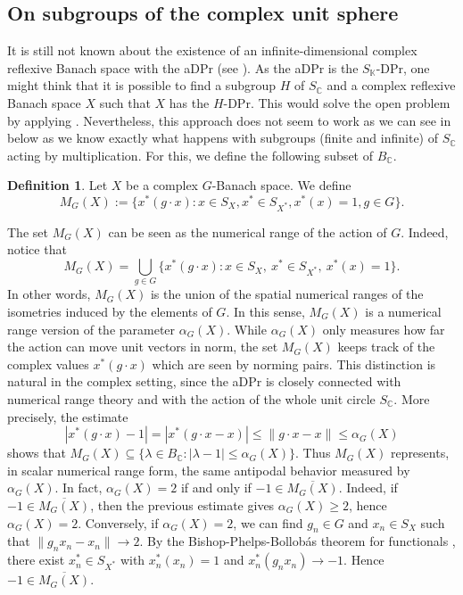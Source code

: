 \documentclass[a4paper,12pt]{amsart}
\theoremstyle{definition}
\theoremstyle{definition}
\newtheorem{definition}[theorem]{Definition}
\theoremstyle{remark}
\numberwithin{equation}{section}
\newcommand{\C}{\mathbb{C}}
\newcommand{\K}{\mathbb{K}}
\renewcommand{\geq}{\geqslant}
\renewcommand{\leq}{\leqslant}
\newcommand{\<}{\langle}
\renewcommand{\>}{\rangle}
\begin{document}
	
	
	
	
	
	
	
	\subsection{On subgroups of the complex unit sphere}  It is still not known about the existence of an infinite-dimensional complex reflexive Banach space with the aDPr (see \cite[Problem 12.6]{KMRW}). As the aDPr is the $S_{\K}$-DPr, one might think that it is possible to find a subgroup $H$ of $S_{\C}$ and a complex reflexive Banach space $X$ such that $X$ has the $H$-DPr. This would solve the open problem by applying . Nevertheless, this approach does not seem to work as we can see in  below as we know exactly what happens with subgroups (finite and infinite) of $S_{\C}$ acting by multiplication. For this, we define the following subset of $B_{\C}$.
	
	
	\begin{definition} Let $X$ be a complex $G$-Banach space. We define 
		\begin{equation*} 
			M_G(X) := \{x^*(g \cdot x): x \in S_X, x^* \in S_{X^*}, x^*(x) = 1, g \in G \}.
		\end{equation*}
	\end{definition}
	The set $M_G(X)$ can be seen as the numerical range of the action of $G$. Indeed, notice that
	\begin{equation*} 
		M_G(X) = \bigcup_{g\in G} \{x^*(g\cdot x): x\in S_X,\ x^*\in S_{X^*},\ x^*(x)=1\}.
	\end{equation*}
	In other words, $M_G(X)$ is the union of the spatial numerical ranges of the isometries induced by the elements of $G$. In this sense, $M_G(X)$ is a numerical range version of the parameter $\alpha_G(X)$. While $\alpha_G(X)$ only measures how far the action can move unit vectors in norm, the set $M_G(X)$ keeps track of the complex values $x^*(g \cdot x)$ which are seen by norming pairs. This distinction is natural in the complex setting, since the aDPr is closely connected
	with numerical range theory and with the action of the whole unit circle $S_{\C}$. More precisely, the estimate
	\begin{equation*} 
		|x^*(g\cdot x)-1| = |x^*(g\cdot x-x)| \leq \|g\cdot x-x\| \leq \alpha_G(X)
	\end{equation*} 
	shows that $M_G(X)\subseteq \{\lambda\in B_{\C}:|\lambda-1|\leq \alpha_G(X)\}$. Thus $M_G(X)$ represents, in scalar numerical range form, the same antipodal
	behavior measured by $\alpha_G(X)$. In fact, $\alpha_G(X)=2$ if and only if
	$-1\in\overline{M_G(X)}$. Indeed, if $-1\in\overline{M_G(X)}$, then the previous estimate gives
	$\alpha_G(X)\geq 2$, hence $\alpha_G(X)=2$. Conversely, if $\alpha_G(X)=2$,
	we can find $g_n\in G$ and $x_n\in S_X$ such that $\|g_nx_n-x_n\|\longrightarrow 2$. By the Bishop-Phelps-Bollobás theorem for functionals \cite{Bollobas1970}, there exist $x_n^*\in S_{X^*}$ with
	$x_n^*(x_n)=1$ and  $x_n^*(g_nx_n)\longrightarrow -1$. Hence $-1\in\overline{M_G(X)}$.
	
\end{document}
